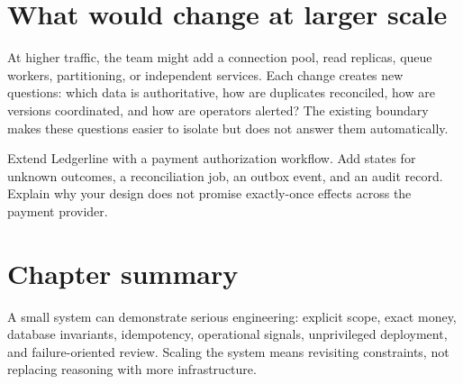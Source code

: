 \section{What would change at larger scale}
At higher traffic, the team might add a connection pool, read replicas, queue
workers, partitioning, or independent services. Each change creates new questions:
which data is authoritative, how are duplicates reconciled, how are versions
coordinated, and how are operators alerted? The existing boundary makes these
questions easier to isolate but does not answer them automatically.

\begin{exercise}
Extend Ledgerline with a payment authorization workflow. Add states for unknown
outcomes, a reconciliation job, an outbox event, and an audit record. Explain why
your design does not promise exactly-once effects across the payment provider.
\end{exercise}

\section{Chapter summary}
A small system can demonstrate serious engineering: explicit scope, exact money,
database invariants, idempotency, operational signals, unprivileged deployment,
and failure-oriented review. Scaling the system means revisiting constraints,
not replacing reasoning with more infrastructure.
